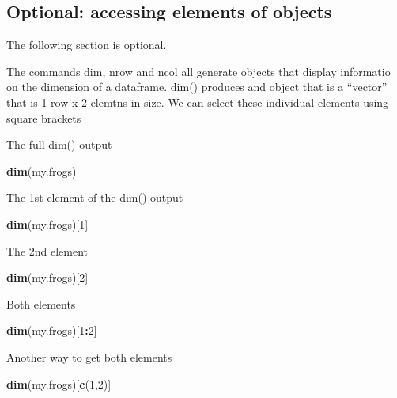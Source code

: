 \documentclass[]{book}
\newenvironment{Shaded}{\begin{snugshade}}{\end{snugshade}}
\newcommand{\KeywordTok}[1]{\textcolor[rgb]{0.13,0.29,0.53}{\textbf{#1}}}
\newcommand{\DecValTok}[1]{\textcolor[rgb]{0.00,0.00,0.81}{#1}}
\newcommand{\OperatorTok}[1]{\textcolor[rgb]{0.81,0.36,0.00}{\textbf{#1}}}
\newcommand{\NormalTok}[1]{#1}
\theoremstyle{definition}
\theoremstyle{definition}
\theoremstyle{definition}
\theoremstyle{remark}
\begin{document}
\subsection{Optional: accessing elements of
objects}\label{optional-accessing-elements-of-objects}

The following section is optional.

The commands dim, nrow and ncol all generate objects that display
informatio on the dimension of a dataframe. dim() produces and object
that is a ``vector'' that is 1 row x 2 elemtns in size. We can select
these individual elements using square brackets

The full dim() output

\begin{Shaded}
\begin{Highlighting}[]
\KeywordTok{dim}\NormalTok{(my.frogs)}
\end{Highlighting}
\end{Shaded}

The 1st element of the dim() output

\begin{Shaded}
\begin{Highlighting}[]
\KeywordTok{dim}\NormalTok{(my.frogs)[}\DecValTok{1}\NormalTok{]}
\end{Highlighting}
\end{Shaded}

The 2nd element

\begin{Shaded}
\begin{Highlighting}[]
\KeywordTok{dim}\NormalTok{(my.frogs)[}\DecValTok{2}\NormalTok{]}
\end{Highlighting}
\end{Shaded}

Both elements

\begin{Shaded}
\begin{Highlighting}[]
\KeywordTok{dim}\NormalTok{(my.frogs)[}\DecValTok{1}\OperatorTok{:}\DecValTok{2}\NormalTok{]}
\end{Highlighting}
\end{Shaded}

Another way to get both elements

\begin{Shaded}
\begin{Highlighting}[]
\KeywordTok{dim}\NormalTok{(my.frogs)[}\KeywordTok{c}\NormalTok{(}\DecValTok{1}\NormalTok{,}\DecValTok{2}\NormalTok{)]}
\end{Highlighting}
\end{Shaded}
\end{document}

